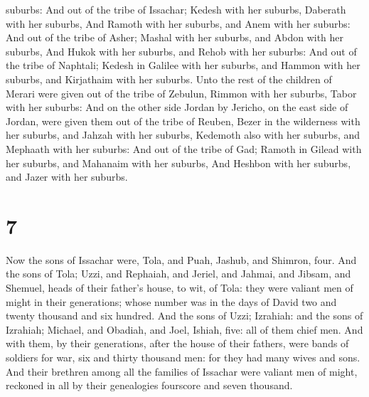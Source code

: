suburbs:  And out of the tribe of Issachar; Kedesh with her
suburbs, Daberath with her suburbs,  And Ramoth with her
suburbs, and Anem with her suburbs:  And out of the tribe
of Asher; Mashal with her suburbs, and Abdon with her suburbs,
 And Hukok with her suburbs, and Rehob with her suburbs:
 And out of the tribe of Naphtali; Kedesh in Galilee with
her suburbs, and Hammon with her suburbs, and Kirjathaim with her
suburbs.  Unto the rest of the children of Merari were
given out of the tribe of Zebulun, Rimmon with her suburbs, Tabor with
her suburbs:  And on the other side Jordan by Jericho, on
the east side of Jordan, were given them out of the tribe of Reuben,
Bezer in the wilderness with her suburbs, and Jahzah with her suburbs,
 Kedemoth also with her suburbs, and Mephaath with her
suburbs:  And out of the tribe of Gad; Ramoth in Gilead
with her suburbs, and Mahanaim with her suburbs,  And
Heshbon with her suburbs, and Jazer with her suburbs.

\hypertarget{section-6}{%
\section{7}\label{section-6}}

 Now the sons of Issachar were, Tola, and Puah, Jashub, and
Shimron, four.  And the sons of Tola; Uzzi, and Rephaiah,
and Jeriel, and Jahmai, and Jibsam, and Shemuel, heads of their father's
house, to wit, of Tola: they were valiant men of might in their
generations; whose number was in the days of David two and twenty
thousand and six hundred.  And the sons of Uzzi; Izrahiah:
and the sons of Izrahiah; Michael, and Obadiah, and Joel, Ishiah, five:
all of them chief men.  And with them, by their generations,
after the house of their fathers, were bands of soldiers for war, six
and thirty thousand men: for they had many wives and sons. 
And their brethren among all the families of Issachar were valiant men
of might, reckoned in all by their genealogies fourscore and seven
thousand.

